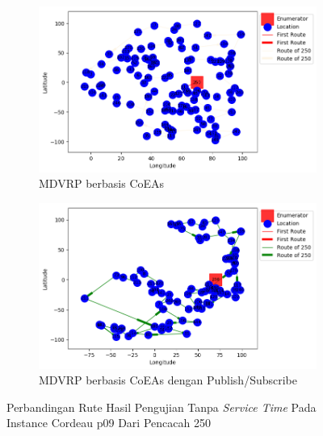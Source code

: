 \begin{figure}[H]
	\centering
	\begin{subfigure}[t]{\textwidth}
		\centering
		\includegraphics[width=\textwidth]{Resources/Images/cordeau_p09/cordeau_p09_notw_250_coes}
		\caption{MDVRP berbasis CoEAs}
		\label{fig:cordeau_p09_notw_250_coes}
	\end{subfigure}
	\begin{subfigure}[t]{\textwidth}
		\centering
		\includegraphics[width=\textwidth]{Resources/Images/cordeau_p09/cordeau_p09_notw_250_pubsub_coes}
		\caption{MDVRP berbasis CoEAs dengan Publish/Subscribe}
		\label{fig:cordeau_p09_notw_250_pubsub_coes}
	\end{subfigure}
	\caption{Perbandingan Rute Hasil Pengujian Tanpa \textit{Service Time} Pada Instance Cordeau p09 Dari Pencacah 250}
	\label{fig:cordeau_p09_notw_250}
\end{figure}


